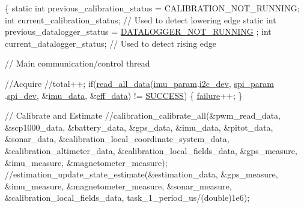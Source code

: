 \begin{DoxyCode}
\{
    \textcolor{keyword}{static} \textcolor{keywordtype}{int} previous\_calibration\_status = CALIBRATION\_NOT\_RUNNING;
    \textcolor{keywordtype}{int} current\_calibration\_status; \textcolor{comment}{// Used to detect lowering edge}
    \textcolor{keyword}{static} \textcolor{keywordtype}{int} previous\_datalogger\_status = \hyperlink{datalogger_01_07Caio-PC's_01conflicted_01copy_012012-11-23_08_8h_a1a224da36800f52f56f30619849f7f5d}{DATALOGGER\_NOT\_RUNNING}
      ;
    \textcolor{keywordtype}{int} current\_datalogger\_status; \textcolor{comment}{// Used to detect rising edge}

    \textcolor{comment}{// Main communication/control thread}

    \textcolor{comment}{//Acquire}
    \textcolor{comment}{//total++;}
    \textcolor{keywordflow}{if}(\hyperlink{communication_01_07C_xC3_xB3pia_01em_01conflito_01de_01Andr_xC3_xA9_01Carvalho_012013-04-26_08_8c_a577b5eb591b20e011d86397f2c6f3a53}{read\_all\_data}(\hyperlink{main2_01_07C_xC3_xB3pia_01em_01conflito_01de_01Caio_01Gustavo_01Mesquita_01Angelo_012013-04-28_08_8c_a9c6b2109fb9402446f92995db60951b5}{imu\_param}.\hyperlink{structIMU__PARAM__STRUCT_a8a870f383fc9ba0b682fdc9b8c0d2734}{i2c\_dev}, \hyperlink{main2_01_07C_xC3_xB3pia_01em_01conflito_01de_01Caio_01Gustavo_01Mesquita_01Angelo_012013-04-28_08_8c_adec2468b88cf50b20e5cf399a3b7e994}{spi\_param}
      .\hyperlink{structSPI__PARAM__STRUCT_abe385c44333d268d17cf648c8e371cad}{spi\_dev}, &\hyperlink{main2_01_07C_xC3_xB3pia_01em_01conflito_01de_01Caio_01Gustavo_01Mesquita_01Angelo_012013-04-28_08_8c_a3cfea12cbe9ca7f1681c950e4cd68606}{imu\_data}, &\hyperlink{main2_01_07C_xC3_xB3pia_01em_01conflito_01de_01Caio_01Gustavo_01Mesquita_01Angelo_012013-04-28_08_8c_a5650ece8c3a277c7f158d75ae65265fa}{eff\_data}) != \hyperlink{communication_01_07C_xC3_xB3pia_01em_01conflito_01de_01Caio_01Gustavo_01Mesquita_01Angelo_012013-04-28_08_8h_aa90cac659d18e8ef6294c7ae337f6b58}{SUCCESS})
    \{
        \hyperlink{main_01_07C_xC3_xB3pia_01em_01conflito_01de_01Caio_01Gustavo_01Mesquita_01Angelo_012013-04-28_08_8c_a4f35e5ea2395561d0bd3b2f45612dc2c}{failure}++;
    \}

    \textcolor{comment}{// Calibrate and Estimate}
    \textcolor{comment}{//calibration\_calibrate\_all(&pwm\_read\_data, &scp1000\_data, &battery\_data,
       &gps\_data, &imu\_data, &pitot\_data, &sonar\_data,
       &calibration\_local\_coordinate\_system\_data, &calibration\_altimeter\_data, &calibration\_local\_fields\_data,
       &gps\_measure, &imu\_measure, &magnetometer\_measure);}
    \textcolor{comment}{//estimation\_update\_state\_estimate(&estimation\_data, &gps\_measure,
       &imu\_measure, &magnetometer\_measure, &sonar\_measure, &calibration\_local\_fields\_data,
       task\_1\_period\_us/(double)1e6);}


\end{DoxyCode}
